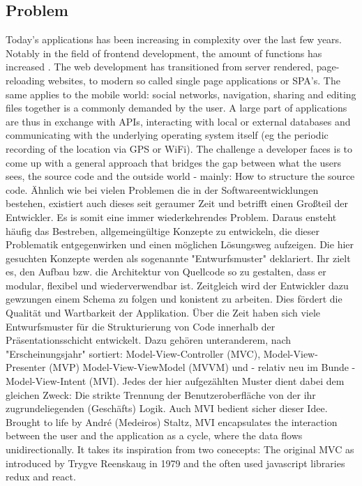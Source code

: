 \subsection{Problem}
\label{subsec:problem}

Today's applications has been increasing in complexity over the last few years.
Notably in the field of frontend development, the amount of functions has increased \cite{kevin2018}. The web development has transitioned from server rendered, 
page-reloading websites, to modern so called single page applications or SPA's.
The same applies to the mobile world: social networks, navigation, sharing and editing files together is a commonly demanded by the user.
A large part of applications are thus in exchange with APIs, interacting with local or external databases
and communicating with the underlying operating system itself (eg the periodic recording of the location via GPS or WiFi).
The challenge a developer faces is to come up with a general approach that bridges the gap between what the users sees, the source code
and the outside world - mainly: How to structure the source code. Ähnlich wie bei vielen Problemen die in der Softwareentwicklungen bestehen, existiert 
auch dieses seit geraumer Zeit und betrifft einen Großteil der Entwickler. Es is somit eine immer wiederkehrendes Problem. Daraus ensteht häufig das Bestreben, 
allgemeingültige Konzepte zu entwickeln, die dieser Problematik entgegenwirken und einen möglichen Lösungsweg aufzeigen. Die hier gesuchten Konzepte werden
als sogenannte "Entwurfsmuster" deklariert. Ihr zielt es, den Aufbau bzw. die Architektur von Quellcode so zu gestalten, dass er modular, flexibel und
wiederverwendbar ist. Zeitgleich wird der Entwickler dazu gewzungen einem Schema zu folgen und konistent zu arbeiten. Dies fördert die Qualität und
Wartbarkeit der Applikation. Über die Zeit haben sich viele Entwurfsmuster für die Strukturierung von Code innerhalb der Präsentationsschicht entwickelt. 
Dazu gehören unteranderem, nach "Erscheinungsjahr" sortiert: Model-View-Controller (MVC), Model-View-Presenter (MVP) Model-View-ViewModel (MVVM) und - relativ 
neu im Bunde - Model-View-Intent (MVI). Jedes der hier aufgezählten Muster dient dabei dem gleichen Zweck: Die strikte Trennung der Benutzeroberfläche von der ihr 
zugrundeliegenden (Geschäfts) Logik. Auch MVI bedient sicher dieser Idee.
Brought to life by André (Medeiros) Staltz, MVI encapsulates the interaction between the user and the application as a cycle, where the data flows unidirectionally.
It takes its inspiration from two conecepts: The original MVC as introduced by Trygve Reenskaug in 1979 and the often used javascript libraries redux and react. 
